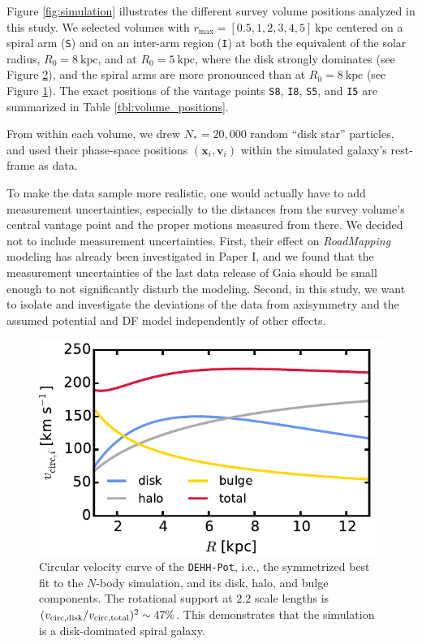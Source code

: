 \documentclass[iop,revtex4,numberedappendix,appendixfloats]{emulateapj}
\newcommand{\vect}[1]{\boldsymbol{#1}}
\newcommand{\RM}{{\sl RoadMapping}}
\begin{document}
\begin{figure}[!htbp]
\label{fig:surf_dens_fourier}
\end{figure}

Figure \ref{fig:simulation} illustrates the different survey volume positions analyzed in this study. We selected volumes with $r_\text{max}=[0.5,1,2,3,4,5]~\text{kpc}$ centered on a spiral arm (\texttt{S}) and on an inter-arm region (\texttt{I}) at both the equivalent of the solar radius, $R_0=8~\text{kpc}$, and at $R_0=5~\text{kpc}$, where the disk strongly dominates (see Figure \ref{fig:DEHH_vcirc_decomposed}), and the spiral arms are more pronounced than at $R_0=8~\text{kpc}$ (see Figure \ref{fig:surf_dens_fourier}). The exact positions of the vantage points \texttt{S8}, \texttt{I8}, \texttt{S5}, and \texttt{I5} are summarized in Table \ref{tbl:volume_positions}.

From within each volume, we drew $N_*=20,000$ random ``disk star'' particles, and used their phase-space positions $(\vect{x}_i,\vect{v}_i)$ within the simulated galaxy's rest-frame as data. 

To make the data sample more realistic, one would actually have to add measurement uncertainties, especially to the distances from the survey volume's central vantage point and the proper motions measured from there. We decided not to include measurement uncertainties. First, their effect on \RM{} modeling has already been investigated in Paper I, and we found that the measurement uncertainties of the last data release of Gaia should be small enough to not significantly disturb the modeling. Second, in this study, we want to isolate and investigate the deviations of the data from axisymmetry and the assumed potential and DF model independently of other effects.

\begin{figure}[!htbp]
\centering
\includegraphics[width=0.7\columnwidth]{fig/plot_vcirc_decomposed_2.pdf}
\caption{Circular velocity curve of the \texttt{DEHH-Pot}, i.e., the symmetrized best fit to the $N$-body simulation, and its disk, halo, and bulge components. The rotational support at $2.2$ scale lengths is $(v_{\rm circ,disk}/v_{\rm circ,total})^2 \sim 47\%$. This demonstrates that the simulation is a disk-dominated spiral galaxy.}
\label{fig:DEHH_vcirc_decomposed}
\end{figure}
\end{document}
